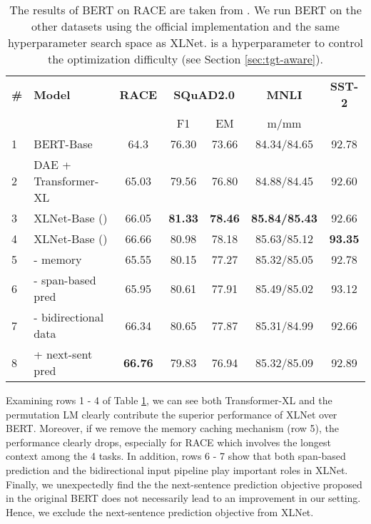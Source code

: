 \documentclass{article}
\begin{document}
\begin{table}[!h]
	\small
	\centering
	
	\begin{tabular}{ll|ccccc}
		\toprule
		\bf \# & \bf Model & \bf RACE & \multicolumn{2}{c}{\bf SQuAD2.0} & \bf MNLI & \bf SST-2 \\
		& & & F1 & EM & m/mm &   \\
		\midrule
		1 & BERT-Base                 & 64.3  & 76.30 & 73.66 & 84.34/84.65 & 92.78 \\
		2 & DAE + Transformer-XL & 65.03 & 79.56 & 76.80 & 84.88/84.45 & 92.60 \\
		3 & XLNet-Base ()        & 66.05 & \bf 81.33 & \bf 78.46 & \bf 85.84/85.43 & 92.66 \\
4 & XLNet-Base ()        & 66.66 & 80.98 & 78.18 & 85.63/85.12 & \bf 93.35 \\
		5 & \quad - memory             & 65.55 & 80.15 & 77.27 & 85.32/85.05 & 92.78 \\
		6 & \quad - span-based pred    & 65.95 & 80.61 & 77.91 & 85.49/85.02 & 93.12 \\
		7 & \quad - bidirectional data & 66.34 & 80.65 & 77.87 & 85.31/84.99 & 92.66 \\
		8 & \quad + next-sent pred     & \bf 66.76 & 79.83 & 76.94 & 85.32/85.09 & 92.89 \\
		\bottomrule
	\end{tabular}
	\caption{\small
		The results of BERT on RACE are taken from \cite{zhang2019dual}. We run BERT on the other datasets using the official implementation and the same hyperparameter search space as XLNet.  is a hyperparameter to control the optimization difficulty (see Section \ref{sec:tgt-aware}).
	}
	\label{tab:ablation}
\end{table}

Examining rows 1 - 4 of Table \ref{tab:ablation}, we can see both Transformer-XL and the permutation LM clearly contribute the superior performance of XLNet over BERT.
Moreover, if we remove the memory caching mechanism (row 5), the performance clearly drops, especially for RACE which involves the longest context among the 4 tasks.
In addition, rows 6 - 7 show that both span-based prediction and the bidirectional input pipeline play important roles in XLNet.
Finally, we unexpectedly find the the next-sentence prediction objective proposed in the original BERT does not necessarily lead to an improvement in our setting.
Hence, we exclude the next-sentence prediction objective from XLNet.
\end{document}

